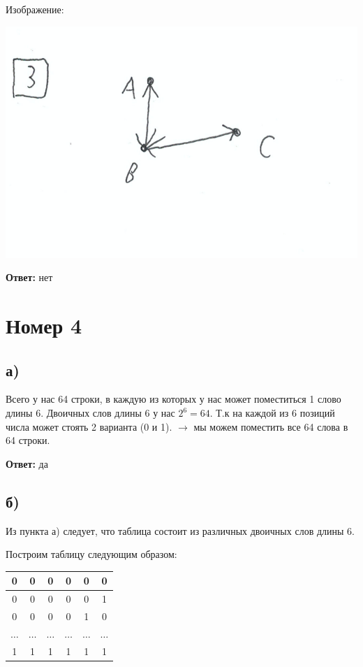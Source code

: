 \documentclass[a4paper,12pt]{article}
\begin{document}
Изображение:
\begin{center}
\includegraphics[scale=0.4]{3.png}
\end{center}
\begin{center}
\textbf{Ответ:} нет
\end{center}
\section*{Номер 4}
\subsection*{а) }
Всего у нас 64 строки, в каждую из которых у нас может поместиться 1 слово длины 6. Двоичных слов длины 6 у нас $2^6 = 64$. Т.к на каждой из 6 позиций числа может стоять 2 варианта (0 и 1). $\rightarrow$ мы можем поместить все 64 слова в 64 строки.
\begin{center}
\textbf{Ответ:} да
\end{center} 
\subsection*{б)}
Из пункта а) следует, что таблица состоит из различных двоичных слов длины 6. 

Построим таблицу следующим образом:
\begin{center}
\begin{tabular}{|c|c|c|c|c|c|}
\hline
 0& 0 & 0 &  0&  0& 0 \\
\hline
 0&0  & 0 & 0 &  0& 1 \\
\hline
 0&  0&0  & 0 &1 &  0\\
\hline
$\ldots $ & $ \ldots $& $\ldots $ & $ \ldots$&$\ldots$  & $\ldots$ \\
\hline
 1& 1 & 1 &  1&  1& 1 \\
\hline
\end{tabular}
\end{center}
\end{document}
